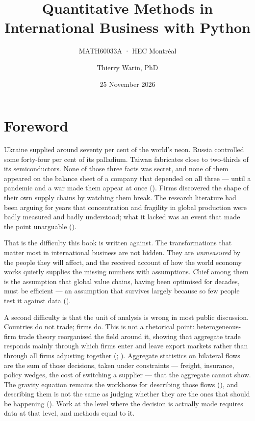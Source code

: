 \documentclass[
  letterpaper,
  10pt,
  twoside,
  openright,
  numbers=noenddot,
  chapterprefix=true]{scrbook}
\title{Quantitative Methods in International Business with Python}
\subtitle{MATH60033A · HEC Montréal}
\author{Thierry Warin, PhD}
\date{25 November 2026}
\renewcommand*\contentsname{Table of contents}
\newcommand\contentsname{Table of contents}
\begin{document}
\frontmatter
\maketitle

\renewcommand*\contentsname{Table of contents}
{
\hypersetup{linkcolor=}
\setcounter{tocdepth}{1}
\tableofcontents
}

\mainmatter
{}

\chapter*{Foreword}\label{foreword}


Ukraine supplied around seventy per cent of the world's neon. Russia
controlled some forty-four per cent of its palladium. Taiwan fabricates
close to two-thirds of its semiconductors. None of those three facts was
secret, and none of them appeared on the balance sheet of a company that
depended on all three --- until a pandemic and a war made them appear at
once (). Firms discovered
the shape of their own supply chains by watching them break. The
research literature had been arguing for years that concentration and
fragility in global production were badly measured and badly understood;
what it lacked was an event that made the point unarguable
().

That is the difficulty this book is written against. The transformations
that matter most in international business are not hidden. They are
\emph{unmeasured} by the people they will affect, and the received
account of how the world economy works quietly supplies the missing
numbers with assumptions. Chief among them is the assumption that global
value chains, having been optimised for decades, must be efficient ---
an assumption that survives largely because so few people test it
against data ().

A second difficulty is that the unit of analysis is wrong in most public
discussion. Countries do not trade; firms do. This is not a rhetorical
point: heterogeneous-firm trade theory reorganised the field around it,
showing that aggregate trade responds mainly through which firms enter
and leave export markets rather than through all firms adjusting
together (;
). Aggregate statistics on
bilateral flows are the sum of those decisions, taken under constraints
--- freight, insurance, policy wedges, the cost of switching a supplier
--- that the aggregate cannot show. The gravity equation remains the
workhorse for describing those flows
(), and describing
them is not the same as judging whether they are the ones that should be
happening (). Work at the level
where the decision is actually made requires data at that level, and
methods equal to it.
\end{document}
